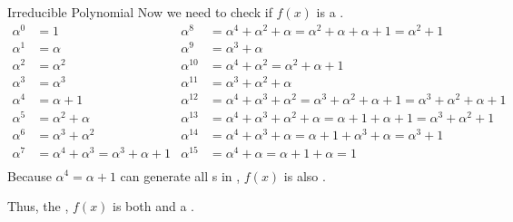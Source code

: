 \begin{example}{Irreducible Polynomial}
  Now we need to check if $f(x)$ is a .
  \begin{align*}
      \alpha^{0} &= 1 & \alpha^{8} &= \alpha^{4} + \alpha^{2} + \alpha = \alpha^{2} + \alpha + \alpha + 1 = \alpha^{2} + 1 \\
      \alpha^{1} &= \alpha & \alpha^{9} &= \alpha^{3} + \alpha \\
      \alpha^{2} &= \alpha^{2} & \alpha^{10} &= \alpha^{4} + \alpha^{2} = \alpha^{2} + \alpha + 1 \\
      \alpha^{3} &= \alpha^{3} & \alpha^{11} &= \alpha^{3} + \alpha^{2} + \alpha \\
      \alpha^{4} &= \alpha + 1 & \alpha^{12} &= \alpha^{4} + \alpha^{3} + \alpha^{2} = \alpha^{3} + \alpha^{2} + \alpha + 1 = \alpha^{3} + \alpha^{2} + \alpha + 1 \\
      \alpha^{5} &= \alpha^{2} + \alpha & \alpha^{13} &= \alpha^{4} + \alpha^{3} + \alpha^{2} + \alpha = \alpha + 1 + \alpha + 1 = \alpha^{3} + \alpha^{2} + 1 \\
      \alpha^{6} &= \alpha^{3} + \alpha^{2} & \alpha^{14} &= \alpha^{4} + \alpha^{3} + \alpha = \alpha + 1 + \alpha^{3} + \alpha = \alpha^{3} + 1 \\
      \alpha^{7} &= \alpha^{4} + \alpha^{3} = \alpha^{3} + \alpha + 1 & \alpha^{15} &= \alpha^{4} + \alpha = \alpha + 1 + \alpha = 1\\
  \end{align*}
  Because $\alpha^{4} = \alpha + 1$ can generate all s in , $f(x)$ is also .

  Thus, the , $f(x)$ is both  and a .
\end{example}

